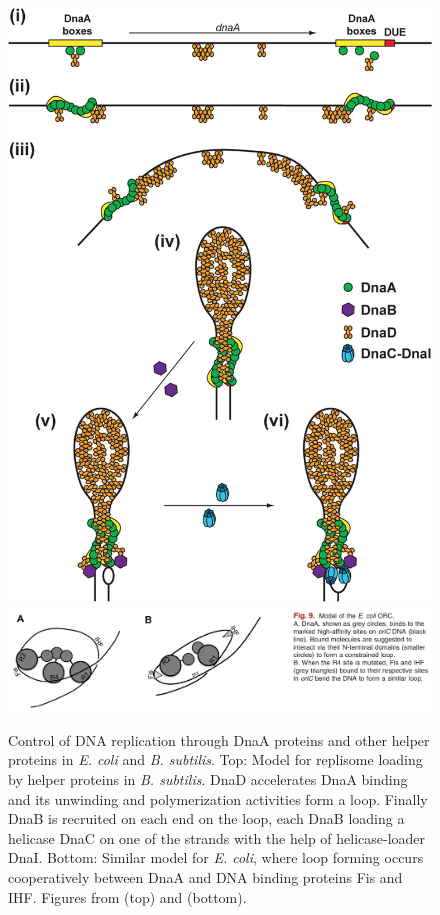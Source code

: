 \begin{figure}[!ht]
	\centering
	\includegraphics[width=0.5\linewidth]{figure/dnaAPolymerizationModel}
	\includegraphics[width=0.8\linewidth]{figure/dnaA3DModel}
	\caption{Control of DNA replication through DnaA proteins and other helper proteins in \textit{E. coli} and \textit{B. subtilis}. Top: Model for replisome loading by helper proteins in \textit{B. subtilis}. DnaD accelerates DnaA binding and its unwinding and polymerization activities form a loop. Finally DnaB is recruited on each end on the loop, each DnaB loading a helicase DnaC on one of the strands with the help of helicase-loader DnaI. Bottom: Similar model for \textit{E. coli}, where loop forming occurs cooperatively between DnaA and DNA binding proteins Fis and IHF. Figures from \citet{briggs_chromosomal_2012} (top) and \citep{kaur_building_2014} (bottom).}
	\label{fig:dnaA}
\end{figure}


